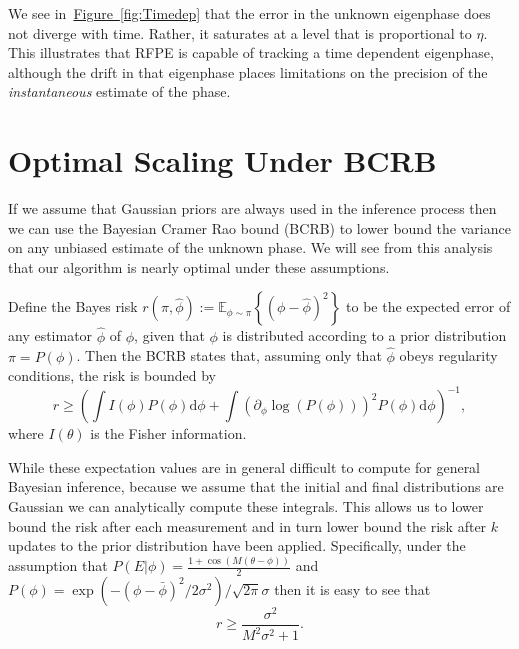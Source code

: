 \documentclass[aps,pra,amsmath,twocolumn,amssymb,superscriptaddress]{revtex4-1}
\newcommand{\expect}[2]{{\mathbb{E}_{#2}}\!\left\{#1 \right\}}
\newcommand{\fig}[1]{\hyperref[fig:#1]{Figure~\ref*{fig:#1}}}
\begin{document}
We see in~\fig{Timedep} that the error in the unknown eigenphase does not diverge with time.  Rather, it saturates at a level that is proportional to $\eta$.  This illustrates that RFPE is capable of tracking a time dependent eigenphase, although the drift in that eigenphase places limitations on the precision of the \emph{instantaneous} estimate of the phase.

\section{Optimal Scaling Under BCRB}
\label{app:BCRB}

If we assume that Gaussian priors are always used in the inference process then
we can use the Bayesian Cramer Rao bound (BCRB) to lower bound the variance on
any unbiased estimate of the unknown phase.  We will see from this analysis that
our algorithm is nearly optimal under these assumptions.

Define the Bayes risk $r(\pi, \hat{\phi}) \mathrel{:=} \expect{(\phi - \hat{\phi})^2}{\phi\sim\pi}$
to be the expected error of any estimator $\hat{\phi}$ of $\phi$,
given that $\phi$ is distributed according to a prior distribution $\pi = P(\phi)$.
Then the BCRB states that, assuming only that $\hat{\phi}$
obeys regularity conditions, the risk is bounded by \cite{gill_applications_1995}
\begin{equation}
    r \ge \left(\int I(\phi) P(\phi) \mathrm{d} \phi + \int (\partial_\phi \log(P(\phi)))^2 P(\phi)\mathrm{d} \phi\right)^{-1},
\end{equation}
where $I(\theta)$ is the Fisher information. 

While these expectation values are in general difficult to compute for general Bayesian inference, because we assume that the initial and final distributions are Gaussian we can analytically compute these integrals.  This allows us to lower bound the risk after each measurement and in turn lower bound the risk after $k$ updates to the prior distribution have been applied.  Specifically, under the assumption that $P(E|\phi) = \frac{1+\cos(M(\theta-\phi))}{2}$ and $P(\phi) = \exp(-(\phi - \bar{\phi})^2 / 2\sigma^2)/\sqrt{2\pi}\sigma$ then it is easy to see that
\begin{equation}
    r \ge \frac{\sigma^2}{M^2 \sigma^2 +1}.
\end{equation}
\end{document}
